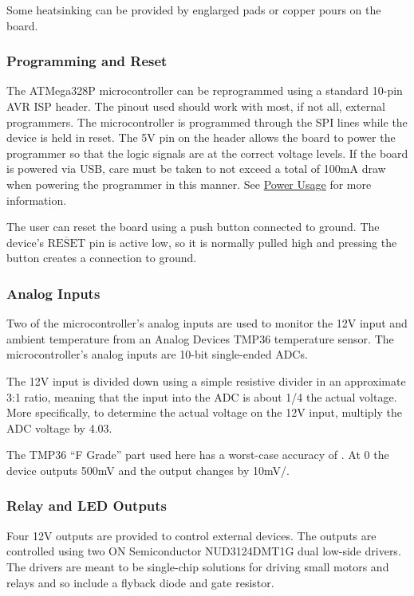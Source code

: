 \documentclass{article}
\newcommand{\textoverline}[1]{$\overline{\mbox{#1}}$}
\begin{document}
Some heatsinking can be provided by englarged pads or copper pours on the board.

\subsubsection{Programming and Reset} \label{sssec:ProgReset}
The ATMega328P microcontroller can be reprogrammed using a standard 10-pin AVR ISP header.  The
pinout used should work with most, if not all, external programmers.  The microcontroller is
programmed through the SPI lines while the device is held in reset.  The 5V pin on the header allows
the board to power the programmer so that the logic signals are at the correct voltage levels.  If
the board is powered via USB, care must be taken to not exceed a total of 100mA draw when powering
the programmer in this manner.  See \hyperref[ssec:PowerUsage]{Power Usage} for more information.

The user can reset the board using a push button connected to ground.  The device's
\textoverline{RESET} pin is active low, so it is normally pulled high and pressing the button
creates a connection to ground.

\subsubsection{Analog Inputs} \label{sssec:AnalogIn}
Two of the microcontroller's analog inputs are used to monitor the 12V input and ambient temperature
from an Analog Devices TMP36 temperature sensor.  The microcontroller's analog inputs are 10-bit
single-ended ADCs.

The 12V input is divided down using a simple resistive divider in an approximate 3:1 ratio, meaning that the
input into the ADC is about 1/4 the actual voltage.  More specifically, to determine the actual
voltage on the 12V input, multiply the ADC voltage by 4.03.

The TMP36 ``F Grade'' part used here has a worst-case accuracy of \textcelsius{}.  At
0\textcelsius{} the device outputs 500mV and the output changes by 10mV/\textcelsius{}.

\subsubsection{Relay and LED Outputs} \label{sssec:RelayLED} 
Four 12V outputs are provided to control external devices.  The outputs are controlled using two ON
Semiconductor NUD3124DMT1G dual low-side drivers.  The drivers are meant to be single-chip solutions
for driving small motors and relays and so include a flyback diode and gate resistor.
\end{document}
